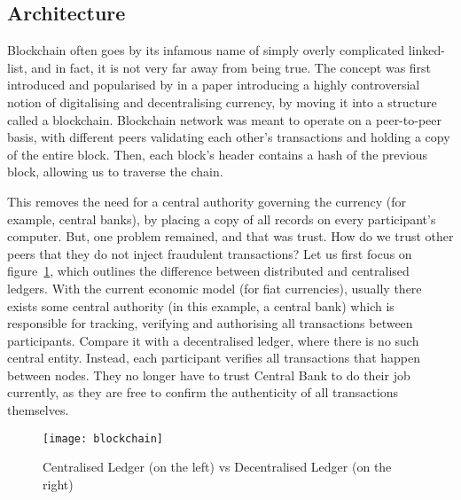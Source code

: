 \subsection{Architecture}
Blockchain often goes by its infamous name of simply overly complicated linked-list, and in fact, it is not very far away from being true. The concept was first introduced and popularised by \citet{nakamoto2008peer} in a paper introducing a highly controversial notion of digitalising and decentralising currency, by moving it into a structure called a blockchain. Blockchain network was meant to operate on a peer-to-peer basis, with different peers validating each other's transactions and holding a copy of the entire block. Then, each block's header contains a hash of the previous block, allowing us to traverse the chain.

This removes the need for a central authority governing the currency (for example, central banks), by placing a copy of all records on every participant's computer. But, one problem remained, and that was trust. How do we trust other peers that they do not inject fraudulent transactions? Let us first focus on figure~\ref{fig:blockchain}, which outlines the difference between distributed and centralised ledgers. With the current economic model (for fiat currencies), usually there exists some central authority (in this example, a central bank) which is responsible for tracking, verifying and authorising all transactions between participants. Compare it with a decentralised ledger, where there is no such central entity. Instead, each participant verifies all transactions that happen between nodes. They no longer have to trust Central Bank to do their job currently, as they are free to confirm the authenticity of all transactions themselves.

\begin{figure}[ht]
    \centering
    \texttt{[image: blockchain]}
    \caption{Centralised Ledger (on the left) vs Decentralised Ledger (on the right)}
    \label{fig:blockchain}
\end{figure}

